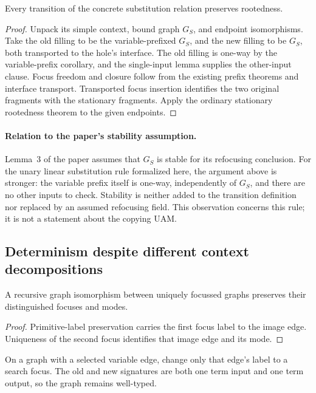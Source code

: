 \begin{theorem}
Every transition of the concrete substitution relation preserves rootedness.
\end{theorem}
\begin{proof}
Unpack its simple context, bound graph $G_S$, and endpoint isomorphisms.
Take the old filling to be the variable-prefixed $G_S$, and the new filling
to be $G_S$, both transported to the hole's interface. The old filling is
one-way by the variable-prefix corollary, and the single-input lemma supplies
the other-input clause. Focus freedom and closure follow from the existing
prefix theorems and interface transport. Transported focus insertion identifies
the two original fragments with the stationary fragments. Apply the ordinary
stationary rootedness theorem to the given endpoints.
\end{proof}
\paragraph{Relation to the paper's stability assumption.}
Lemma~3 of the paper assumes that $G_S$ is stable for its refocusing conclusion.
For the unary linear substitution rule formalized here, the argument above is
stronger: the variable prefix itself is one-way, independently of $G_S$, and
there are no other inputs to check. Stability is neither added to the
transition definition nor replaced by an assumed refocusing field. This
observation concerns this rule; it is not a statement about the copying UAM.


\subsection{Determinism despite different context decompositions}

\begin{lemma}
A recursive graph isomorphism between uniquely focussed graphs preserves their
distinguished focuses and modes.
\end{lemma}
\begin{proof}
Primitive-label preservation carries the first focus label to the image edge.
Uniqueness of the second focus identifies that image edge and its mode.
\end{proof}
\begin{definition}
On a graph with a selected variable edge, change only that edge's label to a
search focus. The old and new signatures are both one term input and one term
output, so the graph remains well-typed.
\end{definition}



